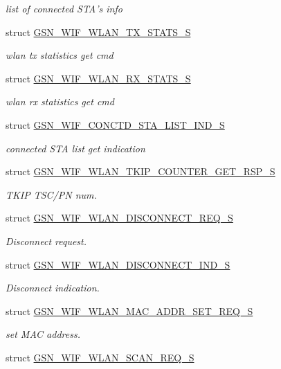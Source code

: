 \begin{DoxyCompactItemize}
\begin{DoxyCompactList}\small\item\em list of connected STA's info \end{DoxyCompactList}\item 
struct \hyperlink{a00410}{GSN\_\-WIF\_\-WLAN\_\-TX\_\-STATS\_\-S}
\begin{DoxyCompactList}\small\item\em wlan tx statistics get cmd \end{DoxyCompactList}\item 
struct \hyperlink{a00398}{GSN\_\-WIF\_\-WLAN\_\-RX\_\-STATS\_\-S}
\begin{DoxyCompactList}\small\item\em wlan rx statistics get cmd \end{DoxyCompactList}\item 
struct \hyperlink{a00321}{GSN\_\-WIF\_\-CONCTD\_\-STA\_\-LIST\_\-IND\_\-S}
\begin{DoxyCompactList}\small\item\em connected STA list get indication \end{DoxyCompactList}\item 
struct \hyperlink{a00407}{GSN\_\-WIF\_\-WLAN\_\-TKIP\_\-COUNTER\_\-GET\_\-RSP\_\-S}
\begin{DoxyCompactList}\small\item\em TKIP TSC/PN num. \end{DoxyCompactList}\item 
struct \hyperlink{a00380}{GSN\_\-WIF\_\-WLAN\_\-DISCONNECT\_\-REQ\_\-S}
\begin{DoxyCompactList}\small\item\em Disconnect request. \end{DoxyCompactList}\item 
struct \hyperlink{a00379}{GSN\_\-WIF\_\-WLAN\_\-DISCONNECT\_\-IND\_\-S}
\begin{DoxyCompactList}\small\item\em Disconnect indication. \end{DoxyCompactList}\item 
struct \hyperlink{a00388}{GSN\_\-WIF\_\-WLAN\_\-MAC\_\-ADDR\_\-SET\_\-REQ\_\-S}
\begin{DoxyCompactList}\small\item\em set MAC address. \end{DoxyCompactList}\item 
struct \hyperlink{a00402}{GSN\_\-WIF\_\-WLAN\_\-SCAN\_\-REQ\_\-S}
\item 

\end{DoxyCompactItemize}
